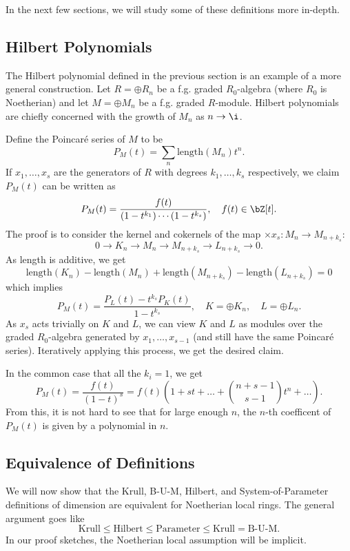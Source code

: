 In the next few sections, we will study some of these definitions more in-depth.

\subsection{Hilbert Polynomials}
The Hilbert polynomial defined in the previous section is an example of a more general construction. Let $R = \oplus R_n$ be a f.g. graded $R_0$-algebra (where $R_0$ is Noetherian) and let $M = \oplus M_n$ be a f.g. graded $R$-module. Hilbert polynomials are chiefly concerned with the growth of $M_n$ as $n \to \i$.

Define the Poincar\'{e} series of $M$ to be
\[
    P_M(t) = \sum_n \text{length}(M_n)t^n.
\]
If $x_1, \dots, x_s$ are the generators of $R$ with degrees $k_1, \dots, k_s$ respectively, we claim $P_M(t)$ can be written as
\[
    P_M(t) = \frac{f(t)}{(1 - t^{k_1}) \cdots (1-t^{k_s})}, \quad f(t) \in \bZ[t].
\]
The proof is to consider the kernel and cokernels of the map $\times x_s: M_n \to M_{n + k_s}$:
\[
    0 \to K_n \to M_n \to M_{n + k_s} \to L_{n + k_s} \to 0.
\]
As length is additive, we get
\[
    \text{length}(K_n) - \text{length}(M_n) + \text{length}(M_{n + k_s}) - \text{length}(L_{n + k_s}) = 0
\]
which implies
\[
    P_M(t) = \frac{P_L(t) - t^{k_s}P_K(t)}{1 - t^{k_s}}, \quad K = \oplus K_n, \quad L = \oplus L_n.
\]
As $x_s$ acts trivially on $K$ and $L$, we can view $K$ and $L$ as modules over the graded $R_0$-algebra generated by $x_1, \dots, x_{s-1}$ (and still have the same Poincar\'{e} series). Iteratively applying this process, we get the desired claim.

In the common case that all the $k_i = 1$, we get
\[
    P_M(t) = \frac{f(t)}{(1 - t)^s} = f(t)\left( 1 + st + \dots + \binom{n+s-1}{s-1}t^n + \dots  \right).
\]
From this, it is not hard to see that for large enough $n$, the $n$-th coefficent of $P_M(t)$ is given by a polynomial in $n$.

\subsection{Equivalence of Definitions}
We will now show that the Krull, B-U-M, Hilbert, and System-of-Parameter definitions of dimension are equivalent for Noetherian local rings. The general argument goes like
\[
    \text{Krull} \le \text{Hilbert} \le \text{Parameter} \le \text{Krull} = \text{B-U-M}.
\]
In our proof sketches, the Noetherian local assumption will be implicit.

